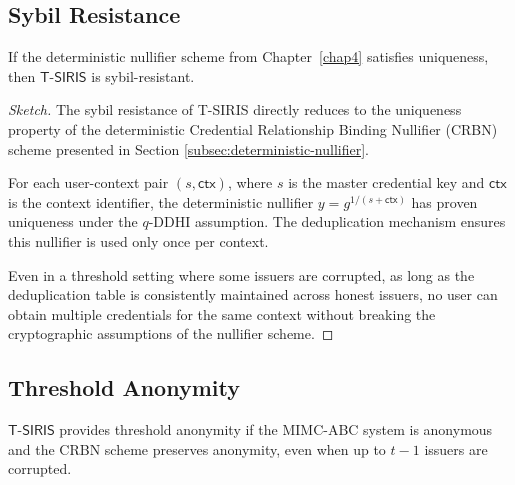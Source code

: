 \subsection{Sybil Resistance}

\begin{theorem}
If the deterministic nullifier scheme from Chapter~\ref{chap4} satisfies uniqueness, then $\mathsf{T\text{-}SIRIS}$ is sybil-resistant.
\end{theorem}

\begin{proof}[Sketch]
The sybil resistance of T-SIRIS directly reduces to the uniqueness property of the deterministic Credential Relationship Binding Nullifier (CRBN) scheme presented in Section \ref{subsec:deterministic-nullifier}. 

For each user-context pair $(s, \mathsf{ctx})$, where $s$ is the master credential key and $\mathsf{ctx}$ is the context identifier, the deterministic nullifier $y = g^{1/(s + \mathsf{ctx})}$ has proven uniqueness under the $q$-DDHI assumption. The deduplication mechanism ensures this nullifier is used only once per context.

Even in a threshold setting where some issuers are corrupted, as long as the deduplication table is consistently maintained across honest issuers, no user can obtain multiple credentials for the same context without breaking the cryptographic assumptions of the nullifier scheme.
\end{proof}

\subsection{Threshold Anonymity}

\begin{theorem}
$\mathsf{T\text{-}SIRIS}$ provides threshold anonymity if the MIMC-ABC system is anonymous and the CRBN scheme preserves anonymity, even when up to $t-1$ issuers are corrupted.
\end{theorem}

